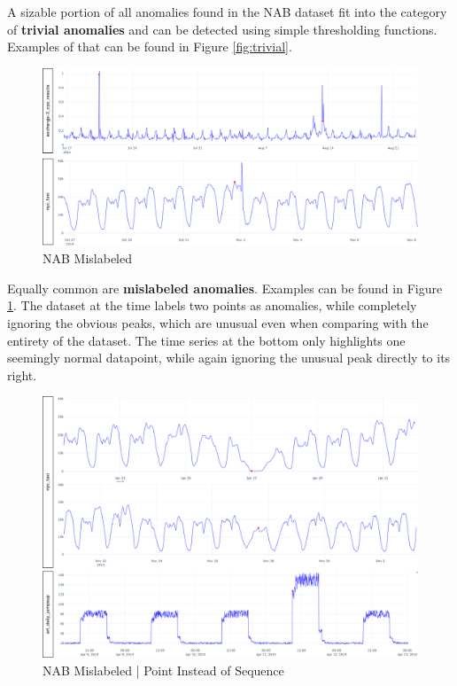 \documentclass[12pt,oneside]{article}
\begin{document}
A sizable portion of all anomalies found in the NAB dataset fit into the category of \textbf{trivial anomalies} and can be detected using simple thresholding functions. Examples of that can be found in Figure \ref{fig:trivial}. \par

\begin{figure}[htbp] 
    \centering 
    \includegraphics[width=\textwidth]{mislab.png}
    \caption{NAB Mislabeled}
    \label{fig:mislab}
\end{figure}

Equally common are \textbf{mislabeled anomalies}. Examples can be found in Figure \ref{fig:mislab}. The dataset at the time labels two points as anomalies, while completely ignoring the obvious peaks, which are unusual even when comparing with the entirety of the dataset. The time series at the bottom only highlights one seemingly normal datapoint, while again ignoring the unusual peak directly to its right.

\begin{figure}[htbp] 
    \centering 
    \includegraphics[width=\textwidth]{point_seq.png}
    \caption{NAB Mislabeled | Point Instead of Sequence}
    \label{fig:point_seq}
\end{figure}
\end{document}
